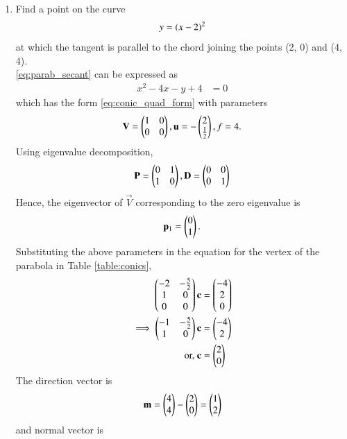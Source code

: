 \begin{enumerate}[label=\thesubsection.\arabic*.,ref=\thesubsection.\theenumi]
\item 
Find a point on the curve 
\begin{align}
y = \left(x-2\right)^2
\label{eq:parab_secant}
\end{align}
at which the tangent is parallel to the chord joining the points (2, 0) and (4, 4).
\\
\solution \eqref{eq:parab_secant} can be expressed as
\begin{align}
x^2  -4x - y + 4 &= 0
\label{eq:parab_secant_twovar}
\end{align}
which has the form \eqref{eq:conic_quad_form} with parameters
\begin{align}
\mathbf{V} = \begin{pmatrix}1 & 0\\0 & 0\end{pmatrix},  \mathbf{u} = -\begin{pmatrix}2\\\frac{1}{2}\end{pmatrix}, f = 4.
\label{eq:parab_secant_twovar_params}
\end{align}
Using eigenvalue decomposition, 
\begin{align}
\mathbf{P} = \begin{pmatrix}0 & 1\\1 & 0\end{pmatrix}, \mathbf{D} = \begin{pmatrix}0 & 0\\0 & 1\end{pmatrix}
\end{align}
%
Hence, the eigenvector of $\vec{V}$ corresponding to the zero eigenvalue is
\begin{align}
\mathbf{p}_1 = \begin{pmatrix}0\\1\end{pmatrix}.
\end{align}
Substituting the above parameters in the equation for the vertex of the parabola in Table \ref{table:conics},
\begin{align}
\begin{pmatrix}-2 & -\frac{5}{2} \\ 1 & 0 \\ 0 & 0\end{pmatrix}\mathbf{c} &= \begin{pmatrix}-4 \\ 2 \\ 0\end{pmatrix}
\\
\implies \begin{pmatrix}-1 & -\frac{5}{2} \\ 1 & 0\end{pmatrix}\mathbf{c} &= \begin{pmatrix}-4 \\ 2 \end{pmatrix}
\\
\text{or, } \mathbf{c} &= \begin{pmatrix}2\\0\end{pmatrix}
\end{align}
The direction vector is
\begin{align}
\mathbf{m} = \begin{pmatrix}4 \\ 4\end{pmatrix}-\begin{pmatrix}2 \\ 0\end{pmatrix} = \begin{pmatrix}1\\2\end{pmatrix}
\label{eq:parab_secant_twovar_m}
\end{align}
and normal vector is
\begin{align}

\end{align}
\end{enumerate}
